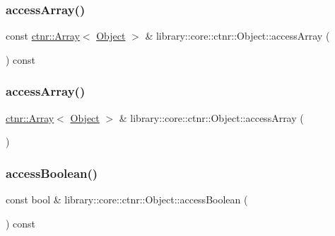 \subsubsection{\texorpdfstring{access\+Array()}{accessArray()}\hspace{0.1cm}{\footnotesize\ttfamily [1/2]}}
{\footnotesize\ttfamily const \hyperlink{classlibrary_1_1core_1_1ctnr_1_1_array}{ctnr\+::\+Array}$<$ \hyperlink{classlibrary_1_1core_1_1ctnr_1_1_object}{Object} $>$ \& library\+::core\+::ctnr\+::\+Object\+::access\+Array (\begin{DoxyParamCaption}{ }\end{DoxyParamCaption}) const}

\mbox{\label{classlibrary_1_1core_1_1ctnr_1_1_object_a1fa4711f9d618f5a4000f78a6815dc3d}} 
\subsubsection{\texorpdfstring{access\+Array()}{accessArray()}\hspace{0.1cm}{\footnotesize\ttfamily [2/2]}}
{\footnotesize\ttfamily \hyperlink{classlibrary_1_1core_1_1ctnr_1_1_array}{ctnr\+::\+Array}$<$ \hyperlink{classlibrary_1_1core_1_1ctnr_1_1_object}{Object} $>$ \& library\+::core\+::ctnr\+::\+Object\+::access\+Array (\begin{DoxyParamCaption}{ }\end{DoxyParamCaption})}

\mbox{\label{classlibrary_1_1core_1_1ctnr_1_1_object_a73af66b804aaae97737b57d8a33ad83c}} 
\subsubsection{\texorpdfstring{access\+Boolean()}{accessBoolean()}\hspace{0.1cm}{\footnotesize\ttfamily [1/2]}}
{\footnotesize\ttfamily const bool \& library\+::core\+::ctnr\+::\+Object\+::access\+Boolean (\begin{DoxyParamCaption}{ }\end{DoxyParamCaption}) const}

